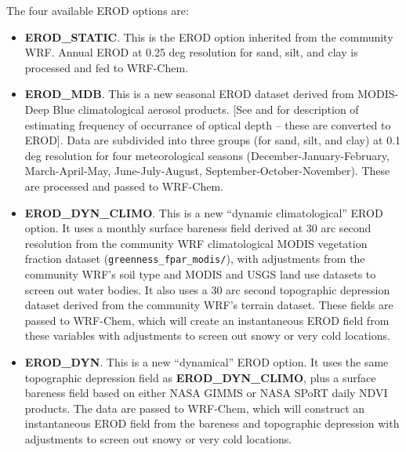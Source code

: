 The four available EROD options are:
\begin{itemize}
\item \textbf{EROD\_STATIC}. This is the EROD option inherited from the 
community WRF. Annual EROD at 0.25 deg resolution for sand, silt, and clay is 
processed and fed to WRF-Chem.
\item \textbf{EROD\_MDB}. This is a new seasonal EROD dataset derived from
MODIS-Deep Blue climatological aerosol products. [See 
\cite{ref:GinouxEtAl2012} and \cite{ref:GinouxEtAl2010} for description of
estimating frequency of occurrance of optical depth -- these are converted
to EROD]. Data are subdivided into three groups (for sand, silt, and clay) at 
0.1 deg resolution for four meteorological seasons (December-January-February,
March-April-May, June-July-August, September-October-November). These are 
processed and passed to WRF-Chem. 
\item \textbf{EROD\_DYN\_CLIMO}. This is a new ``dynamic climatological'' EROD
option. It uses a monthly surface bareness field derived at 30 arc second
resolution from the community WRF climatological MODIS vegetation fraction
dataset (\texttt{greenness\_fpar\_modis/}), with adjustments from the 
community WRF's soil type and MODIS and USGS land use datasets to screen out 
water bodies. It also uses a 30 arc second topographic depression dataset 
derived from the community WRF's terrain dataset. These fields are passed to 
WRF-Chem, which will create an instantaneous EROD field from these variables 
with adjustments to screen out snowy or very cold locations.
\item \textbf{EROD\_DYN}. This is a new ``dynamical'' EROD option. It uses
the same topographic depression field as \textbf{EROD\_DYN\_CLIMO}, plus
a surface bareness field based on either NASA GIMMS or NASA SPoRT daily NDVI
products.  The data are passed to WRF-Chem, which will construct an 
instantaneous EROD field from the bareness and topographic depression with 
adjustments to screen out snowy or very cold locations. 
\end{itemize}

